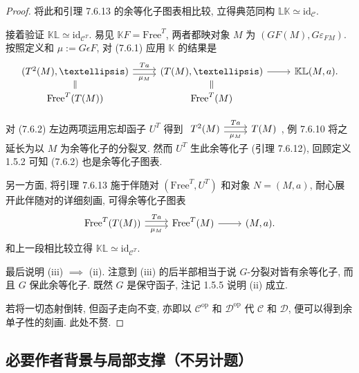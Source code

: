 \documentclass[11pt]{article}
\newcommand{\identity}{\mathrm{id}}
\newcommand{\opp}{\mathrm{op}}
\theoremstyle{definition}
\begin{document}
\begin{proof}
	将此和引理 7.6.13 的余等化子图表相比较, 立得典范同构 $\mathbb{L}\mathbb{K} \simeq \identity_{\mathcal{C}}$.
	
	接着验证 $\mathbb{K}\mathbb{L} \simeq \identity_{\mathcal{C}^T}$. 易见 $\mathbb{K}F = \mathrm{Free}^T$, 两者都映对象 $M$ 为 $(GF(M), G\varepsilon_{FM})$. 按照定义和 $\mu := G\epsilon F$, 对 (7.6.1) 应用 $\mathbb{K}$ 的结果是
\renewcommand{\theequation}{7.6.2}
	\begin{equation}\label{eqn:Beck-aux3}
		\begin{tikzcd}[row sep=small]
			(T^2(M), \ldots) \arrow[shift left, r, "Ta"] \arrow[shift right, r, "\mu_M"'] & (T(M), \ldots) \arrow[r] & \mathbb{K}\mathbb{L}(M, a). \\
			\mathrm{Free}^T(T(M)) \arrow[equal, u] & \mathrm{Free}^T(M) \arrow[equal, u] &
		\end{tikzcd}
	\end{equation}

	对 (7.6.2) 左边两项运用忘却函子 $U^T$ 得到
	$\begin{tikzcd}
		T^2(M) \arrow[shift left, r, "{Ta}"] \arrow[shift right, r, "{\mu_M}"'] & T(M)
	\end{tikzcd}$,
	例 7.6.10 将之延长为以 $M$ 为余等化子的分裂叉. 然而 $U^T$ 生此余等化子 (引理 7.6.12), 回顾定义 1.5.2 可知 (7.6.2) 也是余等化子图表.
	
	另一方面, 将引理 7.6.13 施于伴随对 $(\mathrm{Free}^T, U^T)$ 和对象 $N = (M, a)$, 耐心展开此伴随对的详细刻画, 可得余等化子图表
	\[\begin{tikzcd}[row sep=tiny]
		\mathrm{Free}^T(T(M)) \arrow[shift left, r, "Ta"] \arrow[shift right, r, "\mu_M"'] & \mathrm{Free}^T(M) \arrow[r] & (M, a).
	\end{tikzcd}\]
	和上一段相比较立得 $\mathbb{K}\mathbb{L} \simeq \identity_{\mathcal{C}^T}$.
	
	最后说明 (iii) $\implies$ (ii). 注意到 (iii) 的后半部相当于说 $G$-分裂对皆有余等化子, 而且 $G$ 保此余等化子. 既然 $G$ 是保守函子, 注记 1.5.5 说明 (ii) 成立.
	
	若将一切态射倒转, 但函子走向不变, 亦即以 $\mathcal{C}^{\opp}$ 和 $\mathcal{D}^{\opp}$ 代 $\mathcal{C}$ 和 $\mathcal{D}$, 便可以得到余单子性的刻画. 此处不赘.
\end{proof}
\subsection*{必要作者背景与局部支撑（不另计题）}
\end{document}
